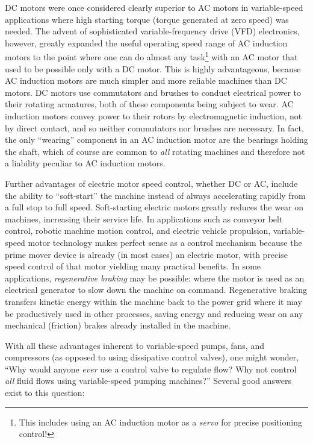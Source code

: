 DC motors were once considered clearly superior to AC motors in variable-speed applications where high starting torque (torque generated at zero speed) was needed.  The advent of sophisticated variable-frequency drive (VFD) electronics, however, greatly expanded the useful operating speed range of AC induction motors to the point where one can do almost any task\footnote{This includes using an AC induction motor as a \textit{servo} for precise positioning control!} with an AC motor that used to be possible only with a DC motor.  This is highly advantageous, because AC induction motors are much simpler and more reliable machines than DC motors.  DC motors use commutators and brushes to conduct electrical power to their rotating armatures, both of these components being subject to wear.  AC induction motors convey power to their rotors by electromagnetic induction, not by direct contact, and so neither commutators nor brushes are necessary.  In fact, the only ``wearing'' component in an AC induction motor are the bearings holding the shaft, which of course are common to \textit{all} rotating machines and therefore not a liability peculiar to AC induction motors.    

\vskip 10pt

Further advantages of electric motor speed control, whether DC or AC, include the ability to ``soft-start'' the machine instead of always accelerating rapidly from a full stop to full speed.  Soft-starting electric motors greatly reduces the wear on machines, increasing their service life.  In applications such as conveyor belt control, robotic machine motion control, and electric vehicle propulsion, variable-speed motor technology makes perfect sense as a control mechanism because the prime mover device is already (in most cases) an electric motor, with precise speed control of that motor yielding many practical benefits.  In some applications, \textit{regenerative braking} may be possible: where the motor is used as an electrical generator to slow down the machine on command.  Regenerative braking transfers kinetic energy within the machine back to the power grid where it may be productively used in other processes, saving energy and reducing wear on any mechanical (friction) brakes already installed in the machine.

\vskip 10pt

With all these advantages inherent to variable-speed pumps, fans, and compressors (as opposed to using dissipative control valves), one might wonder, ``Why would anyone \textit{ever} use a control valve to regulate flow?  Why not control \textit{all} fluid flows using variable-speed pumping machines?''  Several good answers exist to this question:

